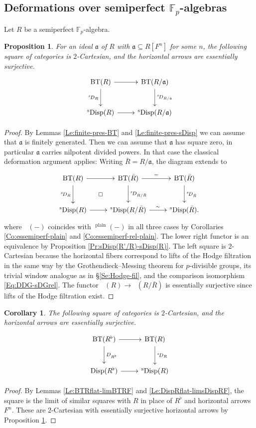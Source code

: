 \documentclass[a4paper,11pt]{amsart}
\theoremstyle{plain}
\newtheorem{Prop}[equation]{Proposition}
\newtheorem{Cor}[equation]{Corollary}
\theoremstyle{definition}
\theoremstyle{remark}
\newcommand{\bPr}{\begin{Prop}}
\newcommand{\ePr}{\end{Prop}}
\newcommand{\bCo}{\begin{Cor}}
\newcommand{\eCo}{\end{Cor}}
\newcommand{\bproof}{\begin{proof}}
\newcommand{\eproof}{\end{proof}}
\numberwithin{equation}{section}
\newcommand{\Fa}{\mathfrak{a}}
\newcommand{\FF}{{\mathbb{F}}}
\DeclareMathOperator{\plain}{plain}
\DeclareMathOperator{\BT}{BT}
\DeclareMathOperator{\Disp}{Disp}
\DeclareMathOperator{\sDisp}{{}^sDisp}
\newcommand{\sD}{{}^{s\!}D}
\begin{document}
\subsection{Deformations over semiperfect $\FF_p$-algebras}
\label{Se:Dieud.equiv:deform}

Let $R$ be a semiperfect $\FF_p$-algebra.

\bPr
\label{Pr:Deform-semiperf}
For an ideal $\Fa$ of $R$ with $\Fa\subseteq R[F^n]$ for some $n$, the following square of categories is $2$-Cartesian, and the horizontal arrows are essentially surjective.
\[
\xymatrix@M+0.2em{
\BT(R) \ar[r] \ar[d]_{\sD_R} & \BT(R/\Fa) \ar[d]^{\sD_{R/\Fa}} \\
\sDisp(R) \ar[r] & \sDisp(R/\Fa)
}
\]
\ePr

\bproof
By Lemmas \ref{Le:finite-pres-BT} and \ref{Le:finite-pres-sDisp} we can assume that $\Fa$ is finitely generated. Then we can assume that $\Fa$ has square zero, in particular $\Fa$ carries nilpotent divided powers. In that case the classical deformation argument applies: Writing $\bar R=R/\Fa$, the diagram extends to
\[
\xymatrix@M+0.2em{
\BT(R) \ar[r] \ar[d]_{\sD_R} \ar@{}[dr]|\square & \BT(\bar R) \ar[r]^-= \ar[d]^{\sD_{R/\bar R}} & \BT(\bar R) \ar[d]^{\sD_{\bar R}} \\
\sDisp(R) \ar[r] & \sDisp(R/\bar R) \ar[r]^-\sim & \sDisp(\bar R).
}
\]
where $\sDisp(-)$  coincides with $\sDisp^{\plain}(-)$ in all three cases  by Corollaries \ref{Co:essemiperf-plain} and \ref{Co:essemiperf-rel-plain}.
The lower right functor is an equivalence by Proposition \ref{Pr:sDisp(R'/R)-sDisp(R)}. The left square is $2$-Cartesian because the horizontal fibers correspond to lifts of the Hodge filtration in the same way by the Grothendieck--Messing theorem for $p$-divisible groups, its trivial window analogue as in \S\ref{Se:Hodge-fil}, and the comparison isomorphism \eqref{Eq:DDG-sDGrel}.
The functor  $\sDisp(R)\to\sDisp(R/\bar R)$  is essentially surjective since lifts of the Hodge filtration exist. 
\eproof

\bCo
\label{Co:Deform-Rflat-R}
The following   square of categories  is $2$-Cartesian, and the horizontal arrows are essentially surjective.
\[
\xymatrix@M+0.2em{
\BT(R^\flat) \ar[r] \ar[d]^{D_{R^\flat}} & \BT(R) \ar[d]^{\sD_R} \\
\Disp(R^\flat) \ar[r] & \sDisp(R)
}
\]
\eCo

\bproof
By Lemmas \ref{Le:BTRflat-limBTRF} and \ref{Le:DispRflat-limsDispRF}, the square is the limit of similar squares with $R$ in place of $R^\flat$ and horizontal arrows $F^n$. These are $2$-Cartesian with essentially surjective horizontal arrows by Proposition \ref{Pr:Deform-semiperf}.
\eproof
\end{document}
